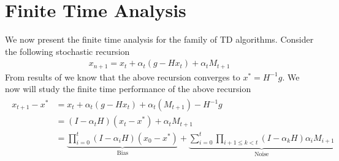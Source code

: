 \section{Finite Time Analysis}
We now present the finite time analysis for the family of TD algorithms. Consider the following stochastic recursion
\begin{align}\label{gensa}
x_{n+1}=x_t+\alpha_t(g-Hx_t)+\alpha_tM_{t+1}
\end{align}
From results of  we know that the above recursion converges to $x^*=H^{-1}g$. We now will study the finite time performance of the above recursion
\begin{align*}
\begin{split}
x_{t+1}-x^*
&=x_t+\alpha_t(g-Hx_t)+\alpha_t(M_{t+1})-H^{-1}g\\
&=(I-\alpha_t H)(x_t-x^*)+\alpha_t M_{t+1}\\
&=\underbrace{\prod_{i=0}^t(I-\alpha_i H)(x_0-x^*)}_{\text{Bias}}+\underbrace{\sum_{i=0}^t \prod_{i+1\leq k<t} (I-\alpha_{k}H)\alpha_i M_{i+1}}_{\text{Noise}}
\end{split}
\end{align*}

